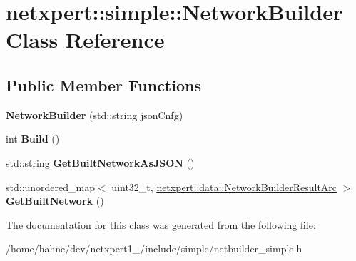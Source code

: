 \hypertarget{classnetxpert_1_1simple_1_1NetworkBuilder}{}\section{netxpert\+:\+:simple\+:\+:Network\+Builder Class Reference}
\label{classnetxpert_1_1simple_1_1NetworkBuilder}
\subsection*{Public Member Functions}
\begin{DoxyCompactItemize}
\item 
{\bfseries Network\+Builder} (std\+::string json\+Cnfg)\hypertarget{classnetxpert_1_1simple_1_1NetworkBuilder_a2de3b0d090c5a4620856410733298a00}{}\label{classnetxpert_1_1simple_1_1NetworkBuilder_a2de3b0d090c5a4620856410733298a00}

\item 
int {\bfseries Build} ()\hypertarget{classnetxpert_1_1simple_1_1NetworkBuilder_af29aed4686e74df5aec2d7c0c5515e28}{}\label{classnetxpert_1_1simple_1_1NetworkBuilder_af29aed4686e74df5aec2d7c0c5515e28}

\item 
std\+::string {\bfseries Get\+Built\+Network\+As\+J\+S\+ON} ()\hypertarget{classnetxpert_1_1simple_1_1NetworkBuilder_a1450b51222cd84dbb9131b7d3876c669}{}\label{classnetxpert_1_1simple_1_1NetworkBuilder_a1450b51222cd84dbb9131b7d3876c669}

\item 
std\+::unordered\+\_\+map$<$ uint32\+\_\+t, \hyperlink{structnetxpert_1_1data_1_1NetworkBuilderResultArc}{netxpert\+::data\+::\+Network\+Builder\+Result\+Arc} $>$ {\bfseries Get\+Built\+Network} ()\hypertarget{classnetxpert_1_1simple_1_1NetworkBuilder_a05c8e60e3d042ec1a3a98a1b277b283d}{}\label{classnetxpert_1_1simple_1_1NetworkBuilder_a05c8e60e3d042ec1a3a98a1b277b283d}

\end{DoxyCompactItemize}


The documentation for this class was generated from the following file\+:\begin{DoxyCompactItemize}
\item 
/home/hahne/dev/netxpert1\+\_/include/simple/netbuilder\+\_\+simple.\+h\end{DoxyCompactItemize}
